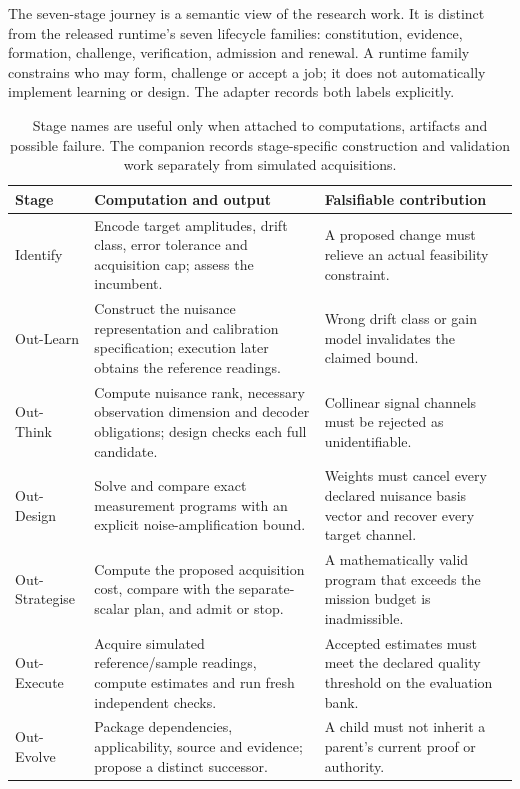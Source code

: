 \documentclass[11pt]{article}
\begin{document}
The seven-stage journey is a semantic view of the research work. It is distinct from the released runtime's seven lifecycle families: constitution, evidence, formation, challenge, verification, admission and renewal. A runtime family constrains who may form, challenge or accept a job; it does not automatically implement learning or design. The adapter records both labels explicitly.

\begin{table}[htbp]
\centering\small
\begin{tabularx}{\linewidth}{P{.15\linewidth}Y Y}
\toprule
\textbf{Stage} & \textbf{Computation and output} & \textbf{Falsifiable contribution}\\
\midrule
Identify & Encode target amplitudes, drift class, error tolerance and acquisition cap; assess the incumbent. & A proposed change must relieve an actual feasibility constraint.\\
Out-Learn & Construct the nuisance representation and calibration specification; execution later obtains the reference readings. & Wrong drift class or gain model invalidates the claimed bound.\\
Out-Think & Compute nuisance rank, necessary observation dimension and decoder obligations; design checks each full candidate. & Collinear signal channels must be rejected as unidentifiable.\\
Out-Design & Solve and compare exact measurement programs with an explicit noise-amplification bound. & Weights must cancel every declared nuisance basis vector and recover every target channel.\\
Out-Strategise & Compute the proposed acquisition cost, compare with the separate-scalar plan, and admit or stop. & A mathematically valid program that exceeds the mission budget is inadmissible.\\
Out-Execute & Acquire simulated reference/sample readings, compute estimates and run fresh independent checks. & Accepted estimates must meet the declared quality threshold on the evaluation bank.\\
Out-Evolve & Package dependencies, applicability, source and evidence; propose a distinct successor. & A child must not inherit a parent's current proof or authority.\\
\bottomrule
\end{tabularx}
\caption{Stage names are useful only when attached to computations, artifacts and possible failure. The companion records stage-specific construction and validation work separately from simulated acquisitions.}
\label{tab:stages}
\end{table}
\end{document}
